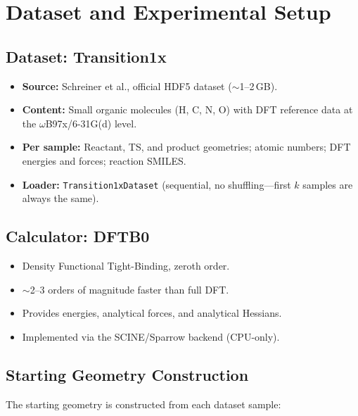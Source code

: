 \documentclass[11pt,a4paper]{article}
\begin{document}
\section{Dataset and Experimental Setup}
\label{sec:setup}

\subsection{Dataset: Transition1x}

\begin{itemize}
  \item \textbf{Source:} Schreiner et al., official HDF5 dataset ($\sim$1--2\,GB).
  \item \textbf{Content:} Small organic molecules (H, C, N, O) with DFT reference data at the $\omega$B97x/6-31G(d) level.
  \item \textbf{Per sample:} Reactant, TS, and product geometries; atomic numbers; DFT energies and forces; reaction SMILES.
  \item \textbf{Loader:} \texttt{Transition1xDataset} (sequential, no shuffling---first $k$ samples are always the same).
\end{itemize}

\subsection{Calculator: DFTB0}

\begin{itemize}
  \item Density Functional Tight-Binding, zeroth order.
  \item $\sim$2--3 orders of magnitude faster than full DFT.
  \item Provides energies, analytical forces, and analytical Hessians.
  \item Implemented via the SCINE/Sparrow backend (CPU-only).
\end{itemize}

\subsection{Starting Geometry Construction}
\label{sec:starting-geom}

The starting geometry is constructed from each dataset sample:
\end{document}
